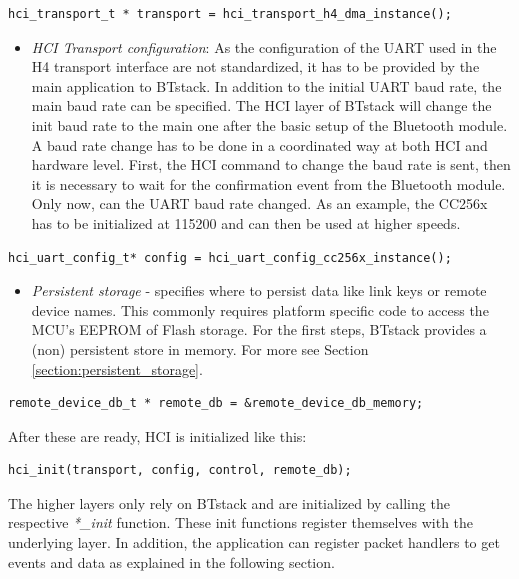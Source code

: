 \documentclass[a4paper,titlepage,oneside,12pt]{amsart} %
\begin{document}
\begin{lstlisting}
hci_transport_t * transport = hci_transport_h4_dma_instance();
\end{lstlisting}

\begin{itemize}
\item \emph {HCI Transport configuration}: As the configuration of the UART used in the H4 transport interface are not standardized, it has to be provided by the main application to BTstack. In addition to the initial UART baud rate, the main baud rate can be specified. The HCI layer of BTstack will change the init baud rate to the main one after the basic setup of the Bluetooth module. A baud rate change has to be done in a coordinated way at both HCI and hardware level. First, the HCI command to change the baud rate is sent, then it is necessary to wait for the confirmation event from the Bluetooth module. Only now, can the UART baud rate changed. As an example, the CC256x has to be initialized at 115200 and can then be used at higher speeds.
\end{itemize}

\begin{lstlisting}
hci_uart_config_t* config = hci_uart_config_cc256x_instance();
\end{lstlisting}

\begin{itemize}
\item \emph {Persistent storage} - specifies where to persist data like link keys or remote device names. This commonly requires platform specific code to access the MCU's EEPROM of Flash storage. For the first steps, BTstack provides a (non) persistent store in memory. For more see Section \ref{section:persistent_storage}.
\end{itemize}

\begin{lstlisting}
remote_device_db_t * remote_db = &remote_device_db_memory;
\end{lstlisting}


After these are ready, HCI is initialized like this:
\begin{lstlisting}
hci_init(transport, config, control, remote_db);
\end{lstlisting}

The higher layers only rely on BTstack and are initialized by calling the respective \emph{*\_init} function. These init functions register themselves with the underlying layer. In addition, the application can register packet handlers to get events and data as explained in the following section.
\end{document}
